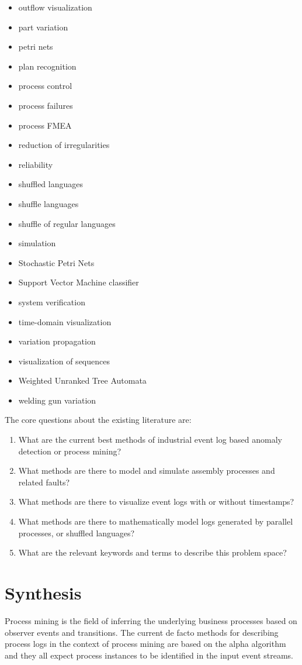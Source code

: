 \documentclass[a4paper,10pt]{article}
\begin{document}
\begin{itemize}
 \item outflow visualization
 \item part variation
 \item petri nets
 \item plan recognition
 \item process control
 \item process failures
 \item process FMEA
 \item reduction of irregularities
 \item reliability
 \item shuffled languages
 \item shuffle languages
 \item shuffle of regular languages
 \item simulation
 \item Stochastic Petri Nets
 \item Support Vector Machine classifier
 \item system verification
 \item time-domain visualization
 \item variation propagation
 \item visualization of sequences
 \item Weighted Unranked Tree Automata
 \item welding gun variation
\end{itemize}

The core questions about the existing literature are:
\begin{enumerate}
 \item What are the current best methods of industrial event log based anomaly detection or process mining?
 \item What methods are there to model and simulate assembly processes and related faults?
 \item What methods are there to visualize event logs with or without timestamps?
 \item What methods are there to mathematically model logs generated by parallel processes, or shuffled languages?
 \item What are the relevant keywords and terms to describe this problem space?
\end{enumerate}

\section{Synthesis}

Process mining is the field of inferring the underlying business processes based on observer events and transitions.
The current de facto methods for describing process logs in the context of process mining are based on the alpha algorithm and they all expect process instances
to be identified in the input event streams.
\end{document}
